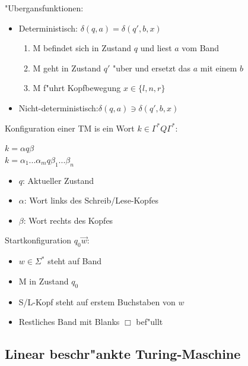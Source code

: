 \documentclass[11pt, a4paper]{scrartcl}
\begin{document}
\vspace{1em}

"Ubergansfunktionen:
\begin{itemize}
    \item Deterministisch: \qquad \qquad $\delta(q, a) = \delta(q', b, x)$
    \begin{enumerate}
        \item M befindet sich in Zustand $q$ und liest $a$ vom Band
        \item M geht in Zustand $q'$ "uber und ersetzt das $a$ mit einem $b$
        \item M f"uhrt Kopfbewegung $x \in \{l, n, r\}$
      \end{enumerate}

    \item Nicht-deterministisch:\qquad$\delta(q, a) \ni \delta(q', b, x)$
\end{itemize}

\vspace{1em}

Konfiguration einer TM is ein Wort $k \in \Gamma^* Q \Gamma^*$:

$k = \alpha q \beta$\\
$k = \alpha_1...\alpha_m q \beta_1...\beta_n$

\begin{itemize}
    \item $q$: Aktueller Zustand
    \item $\alpha$: Wort links des Schreib/Lese-Kopfes
    \item $\beta$: Wort rechts des Kopfes
\end{itemize}

\vspace{1em}

Startkonfiguration $q_0\vec{w}$:

\begin{itemize}
    \item $w \in \Sigma^*$ steht auf Band
    \item M in Zustand $q_0$
    \item S/L-Kopf steht auf erstem Buchstaben von $w$
    \item Restliches Band mit Blanks $\Box$ bef"ullt
\end{itemize}

\subsection{Linear beschr"ankte Turing-Maschine}
\end{document}
